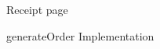 \documentclass[a4paper,14pt]{extarticle}
\begin{document}
\begin{itemize}
        \begin{figure}[H]
    \centering
        \caption{Receipt page}
\end{figure}
    
        \begin{figure}[H]
    \centering
        \caption{generateOrder Implementation}
\end{figure}

\end{itemize}
\end{document}
